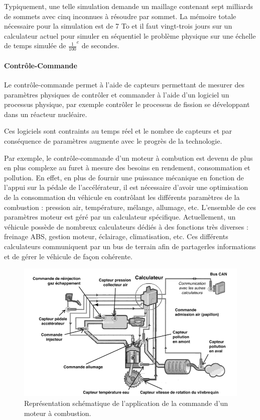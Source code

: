 \documentclass[fleqn,11pt]{article}
\begin{document}
Typiquement, une telle simulation demande un maillage contenant sept milliards de sommets avec cinq inconnues à résoudre
par sommet. La mémoire totale nécessaire pour la simulation est de 7 To et il faut vingt-trois jours sur un calculateur actuel
pour simuler en séquentiel le problème physique sur une échelle de temps simulée de ${\frac{1}{100}}^{e}$ de secondes.

\paragraph{Contrôle-Commande}

Le contrôle-commande permet à l'aide de capteurs permettant de mesurer des paramètres physiques de contrôler et commander à l'aide d'un logiciel un processus physique, par exemple contrôler le processus de fission se développant dans un réacteur nucléaire. 

Ces logiciels sont contraints au temps réel et le nombre de capteurs et par conséquence de paramètres augmente avec le progrès de la technologie.

Par exemple, le contrôle-commande d'un moteur à combution est devenu de plus en plus complexe au furet à mesure des besoins en rendement, consommation et pollution. En effet, en plus de fournir une puissance mécanique en fonction de l'appui sur la pédale de l'accélérateur,  il est nécessaire d'avoir une optimisation de la consommation du véhicule en contrôlant les différents paramètres de la combustion : pression air, température, mélange,  allumage, etc. L'ensemble de ces paramètres moteur est géré par un calculateur spécifique. Actuellement,  un véhicule possède de nombreux calculateurs dédiés à des fonctions très diverses : freinage ABS, gestion moteur, éclairage,  climatisation, etc. Ces différents calculateurs communiquent par un bus de terrain afin de partagerles informations et de gérer le véhicule de façon cohérente.

\begin{figure}[h]
\includegraphics[width=\textwidth]{ControleCommande}
\caption{Représentation schématique de l'application de la commande d'un moteur à combustion.}
\end{figure}
\end{document}
